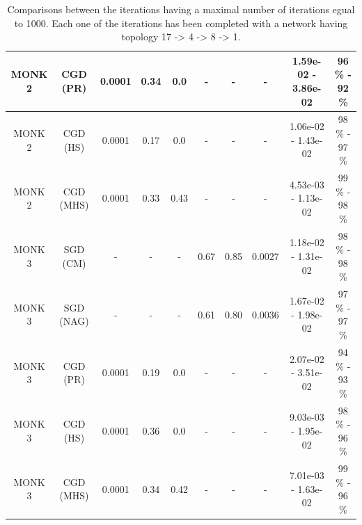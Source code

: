 \begin{table}[H]
\begin{subtable}{\textwidth}
{\begin{tabular}{| c | c | c | c | c | c | c | c | c | c |}
                            \hline
                            MONK 2 &   CGD (PR) &   0.0001 &     0.34 &  0.0 &     - &      - &       - &  1.59e-02 - 3.86e-02 &  96 \% - 92 \% \\
                            \hline
                            MONK 2 &   CGD (HS) &   0.0001 &     0.17 &  0.0 &     - &      - &       - &  1.06e-02 - 1.43e-02 &  98 \% - 97 \% \\
                            \hline
                            MONK 2 &  CGD (MHS) &   0.0001 &     0.33 &  0.43 &     - &      - &       - &  4.53e-03 - 1.13e-02 &  99 \% - 98 \% \\
                            \hline
                            \hline
                            MONK 3 &   SGD (CM) &        - &        - &     - &  0.67 &   0.85 &  0.0027 &  1.18e-02 - 1.31e-02 &  98 \% - 98 \% \\
                            \hline
                            MONK 3 &  SGD (NAG) &        - &        - &     - &  0.61 &   0.80 &  0.0036 &  1.67e-02 - 1.98e-02 &  97 \% - 97 \% \\
                            \hline
                            MONK 3 &   CGD (PR) &   0.0001 &     0.19 &  0.0 &     - &      - &       - &  2.07e-02 - 3.51e-02 &  94 \% - 93 \% \\
                            \hline
                            MONK 3 &   CGD (HS) &   0.0001 &     0.36 &  0.0 &     - &      - &       - &  9.03e-03 - 1.95e-02 &  98 \% - 96 \% \\
                            \hline
                            \rowcolor[gray]{.9}
                            MONK 3 &  CGD (MHS) &   0.0001 &     0.34 &  0.42 &     - &      - &       - &  7.01e-03 - 1.63e-02 &  99 \% - 96 \% \\
                            \hline
                        \end{tabular}
                    }
                \end{subtable}
                \caption{Comparisons between the iterations having a maximal number of iterations egual to 1000.
                Each one of the iterations has been completed with a network having topology
                17 -> 4 -> 8 -> 1.}
                \label{tab:monks_max_iterations}
            \end{table}


